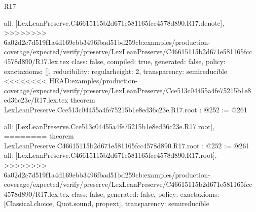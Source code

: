 \begin{lexlean}{R17}
\begin{coremodule}
{{{{{  all: [LexLeanPreserve.C46615115b2d671e581165fcc4578d890.R17.denote],
>>>>>>>> 6a02d2c7d519f1a4d169ebb3496fbad51bd259cb:examples/production-coverage/expected/verify/preserve/LexLeanPreserve/C46615115b2d671e581165fcc4578d890/R17.lex.tex
  class: false,
  compiled: true,
  generated: false,
  policy: exact{axioms: []},
  reducibility: regular{height: 2},
  transparency: semireducible
}
<<<<<<<< HEAD:examples/production-coverage/expected/verify/preserve/LexLeanPreserve/Cce513c04455a4fe75215b1e8ed36c23e/R17.lex.tex
theorem LexLeanPreserve.Cce513c04455a4fe75215b1e8ed36c23e.R17.root : @252 := @261 {
  all: [LexLeanPreserve.Cce513c04455a4fe75215b1e8ed36c23e.R17.root],
========
theorem LexLeanPreserve.C46615115b2d671e581165fcc4578d890.R17.root : @252 := @261 {
  all: [LexLeanPreserve.C46615115b2d671e581165fcc4578d890.R17.root],
>>>>>>>> 6a02d2c7d519f1a4d169ebb3496fbad51bd259cb:examples/production-coverage/expected/verify/preserve/LexLeanPreserve/C46615115b2d671e581165fcc4578d890/R17.lex.tex
  class: false,
  generated: false,
  policy: exact{axioms: [Classical.choice, Quot.sound, propext]},
  transparency: semireducible
}

}}}}}
\end{coremodule}
\end{lexlean}
